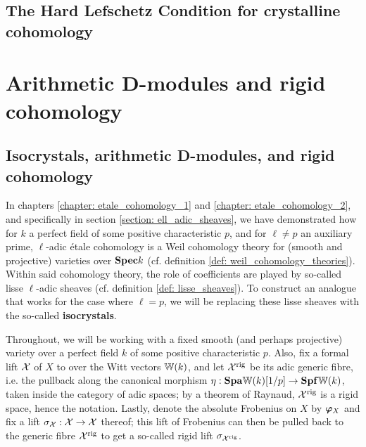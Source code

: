         \subsection{The Hard Lefschetz Condition for crystalline cohomology}
        
    \section{Arithmetic D-modules and rigid cohomology}
        \subsection{Isocrystals, arithmetic D-modules, and rigid cohomology}
            In chapters \ref{chapter: etale_cohomology_1} and \ref{chapter: etale_cohomology_2}, and specifically in section \ref{section: ell_adic_sheaves}, we have demonstrated how for $k$ a perfect field of some positive characteristic $p$, and for $\ell \not = p$ an auxiliary prime, $\ell$-adic \'etale cohomology is a Weil cohomology theory for (smooth and projective) varieties over $\mathbf{Spec} k$ (cf. definition \ref{def: weil_cohomology_theories}). Within said cohomology theory, the role of coefficients are played by so-called lisse $\ell$-adic sheaves (cf. definition \ref{def: lisse_sheaves}). To construct an analogue that works for the case where $\ell = p$, we will be replacing these lisse sheaves with the so-called \textbf{isocrystals}.
            
            \begin{convention}
                Throughout, we will be working with a fixed smooth (and perhaps projective) variety over a perfect field $k$ of some positive characteristic $p$. Also, fix a formal lift $\mathcal{X}$ of $X$ to over the Witt vectors $\mathbb{W}(k)$, and let $\mathcal{X}^{\mathrm{rig}}$ be its adic generic fibre, i.e. the pullback along the canonical morphism $\eta: \mathbf{Spa}\mathbb{W}(k)[1/p] \to \mathbf{Spf}\mathbb{W}(k)$, taken inside the category of adic spaces; by a theorem of Raynaud, $\mathcal{X}^{\mathrm{rig}}$ is a rigid space, hence the notation. Lastly, denote the absolute Frobenius on $X$ by $\bm{\varphi}_X$ and fix a lift $\sigma_{\mathcal{X}}: \mathcal{X} \to \mathcal{X}$ thereof; this lift of Frobenius can then be pulled back to the generic fibre $\mathcal{X}^{\mathrm{rig}}$ to get a so-called rigid lift $\sigma_{\mathcal{X}^{\mathrm{rig}}}$.
            \end{convention}
            
